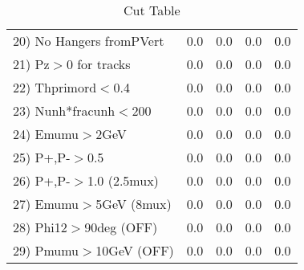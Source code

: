 \begin{table}[h!]
\begin{tabular}{||l||r|r|r|r||}
 20) No Hangers fromPVert &         0.0 &         0.0 &         0.0 &         0.0 \\
 21) Pz$>$0 for tracks    &         0.0 &         0.0 &         0.0 &         0.0 \\
 22) Thprimord$<$0.4      &         0.0 &         0.0 &         0.0 &         0.0 \\
 23) Nunh*fracunh$<$200   &         0.0 &         0.0 &         0.0 &         0.0 \\
 24) Emumu$>$2GeV         &         0.0 &         0.0 &         0.0 &         0.0 \\
 25) P+,P-$>$0.5          &         0.0 &         0.0 &         0.0 &         0.0 \\
 26) P+,P-$>$1.0 (2.5mux) &         0.0 &         0.0 &         0.0 &         0.0 \\
 27) Emumu$>$5GeV  (8mux) &         0.0 &         0.0 &         0.0 &         0.0 \\
 28) Phi12$>$90deg  (OFF) &         0.0 &         0.0 &         0.0 &         0.0 \\
 29) Pmumu$>$10GeV  (OFF) &         0.0 &         0.0 &         0.0 &         0.0 \\
 \hline
 \hline
 \end{tabular}
 \caption{Cut Table \cohrp  }
 \label{tab-cut_crhop}
 \end{table}

